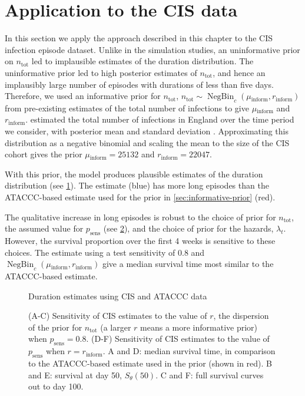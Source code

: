 \documentclass[12pt]{article}
\DeclareMathOperator{\NBr}{NegBin}
\newcommand{\NBc}{\NBr_{c}}
\newcommand\citePersonalComms[1]{(#1, personal communication)}
\newcommand{\psens}{p_\text{sens}}
\newcommand{\ntot}{n_\text{tot}}
\newcommand{\inform}{{_{\text{inform}}}}
\begin{document}
\section{Application to the CIS data}

In this section we apply the approach described in this chapter to the CIS infection episode dataset.
Unlike in the simulation studies, an uninformative prior on $\ntot$ led to implausible estimates of the duration distribution.
The uninformative prior led to high posterior estimates of $\ntot$, and hence an implausibly large number of episodes with durations of less than five days.
Therefore, we used an informative prior for $\ntot$, $\ntot \sim \NBc(\mu\inform, r\inform)$ from pre-existing estimates of the total number of infections to give $\mu\inform$ and $r\inform$.
\citet{birrellRTM2} estimated the total number of infections in England over the time period we consider, with posterior mean  and standard deviation .
Approximating this distribution as a negative binomial and scaling the mean to the size of the CIS cohort gives the prior $\mu\inform = 25132$ and $r\inform = 22047$.

With this prior, the model produces plausible estimates of the duration distribution (see \cref{imperf-test:fig:cis-estimates}).
The estimate (blue) has more long episodes than the ATACCC-based estimate used for the prior in \cref{sec:informative-prior} (red).

The qualitative increase in long episodes is robust to the choice of prior for $\ntot$, the assumed value for $\psens$ (see \cref{imperf-test:fig:cis-sensitivity}), and the choice of prior for the hazards, $\lambda_t$.
However, the survival proportion over the first 4 weeks is sensitive to these choices.
The estimate using a test sensitivity of 0.8 and $\NBc(\mu\inform, r\inform)$ give a median survival time most similar to the ATACCC-based estimate.
\begin{figure}
  \caption{Duration estimates using CIS and ATACCC data}
  \label{imperf-test:fig:cis-estimates}
\end{figure}
\begin{figure}
  \vspace{-2.5cm}
  \caption{%
    (A-C) Sensitivity of CIS estimates to the value of $r$, the dispersion of the prior for $\ntot$ (a larger $r$ means a more informative prior) when $\psens = 0.8$.
    (D-F) Sensitivity of CIS estimates to the value of $\psens$ when $r = r\inform$.
    A and D: median survival time, in comparison to the ATACCC-based estimate used in the prior (shown in red).
    B and E: survival at day 50, $S_\theta(50)$.
    C and F: full survival curves out to day 100.
  }
  \label{imperf-test:fig:cis-sensitivity}
\end{figure}
\end{document}
